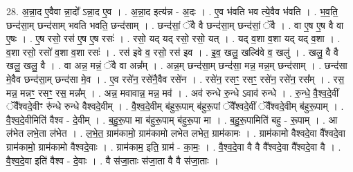 \documentclass[17pt]{extarticle}
\begin{document}
28. अ॒न्ना॒द ए॒वैवा न्ना॒दो᳚ ऽन्ना॒द ए॒व । . अ॒न्ना॒द इत्य॑न्न - अ॒दः । . ए॒व भ॑वति भव त्ये॒वैव भ॑वति । . भ॒व॒ति॒ छन्द॑सा॒म् छन्द॑साम् भवति भवति॒ छन्द॑साम् । . छन्द॑सां॒ ॅवै वै छन्द॑सा॒म् छन्द॑सां॒ ॅवै । . वा ए॒ष ए॒ष वै वा ए॒षः । . ए॒ष रसो॒ रस॑ ए॒ष ए॒ष रसः॑ । . रसो॒ यद् यद् रसो॒ रसो॒ यत् । . यद् व॒शा व॒शा यद् यद् व॒शा । . व॒शा रसो॒ रसो॑ व॒शा व॒शा रसः॑ । . रस॑ इवे व॒ रसो॒ रस॑ इव । . इ॒व॒ खलु॒ खल्वि॑वे व॒ खलु॑ । . खलु॒ वै वै खलु॒ खलु॒ वै । . वा अन्न॒ मन्नं॒ ॅवै वा अन्न᳚म् । . अन्न॒म् छन्द॑सा॒म् छन्द॑सा॒ मन्न॒ मन्न॒म् छन्द॑साम् । . छन्द॑सा मे॒वैव छन्द॑सा॒म् छन्द॑सा मे॒व । . ए॒व रसे॑न॒ रसे॑नै॒वैव रसे॑न । . रसे॑न॒ रसꣳ॒॒ रसꣳ॒॒ रसे॑न॒ रसे॑न॒ रस᳚म् । . रस॒ मन्न॒ मन्नꣳ॒॒ रसꣳ॒॒ रस॒ मन्न᳚म् । . अन्न॒ मवावान्न॒ मन्न॒ मव॑ । . अव॑ रुन्धे रु॒न्धे ऽवाव॑ रुन्धे । . रु॒न्धे॒ वै॒श्व॒दे॒वीं ॅवै᳚श्वदे॒वीꣳ रु॑न्धे रुन्धे वैश्वदे॒वीम् । . वै॒श्व॒दे॒वीम् ब॑हुरू॒पाम् ब॑हुरू॒पां ॅवै᳚श्वदे॒वीं ॅवै᳚श्वदे॒वीम् ब॑हुरू॒पाम् । . वै॒श्व॒दे॒वीमिति॑ वैश्व - दे॒वीम् । . ब॒हु॒रू॒पा मा ब॑हुरू॒पाम् ब॑हुरू॒पा मा । . ब॒हु॒रू॒पामिति॑ बहु - रू॒पाम् । . आ ल॑भेत लभे॒ता ल॑भेत । . ल॒भे॒त॒ ग्राम॑कामो॒ ग्राम॑कामो लभेत लभेत॒ ग्राम॑कामः । . ग्राम॑कामो वैश्वदे॒वा वै᳚श्वदे॒वा ग्राम॑कामो॒ ग्राम॑कामो वैश्वदे॒वाः । . ग्राम॑काम॒ इति॒ ग्राम॑ - का॒मः॒ । . वै॒श्व॒दे॒वा वै वै वै᳚श्वदे॒वा वै᳚श्वदे॒वा वै । . वै॒श्व॒दे॒वा इति॑ वैश्व - दे॒वाः । . वै स॑जा॒ताः स॑जा॒ता वै वै स॑जा॒ताः । \newline
\end{document}

